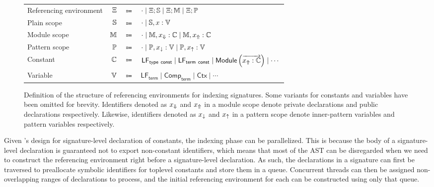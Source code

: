 \begin{figure}[htb]
\centering
\begin{tabular}{lrcl}
Referencing environment & $\Xi$ & $\Coloneqq$ & $\cdot \mid \Xi; \mathbb{S} \mid \Xi; \mathbb{M} \mid \Xi; \mathbb{P}$\\
Plain scope & $\mathbb{S}$ & $\Coloneqq$ & $\cdot \mid \mathbb{S}, x : \mathbb{V}$\\
Module scope & $\mathbb{M}$ & $\Coloneqq$ & $\cdot \mid \mathbb{M}, x_\Downarrow : \mathbb{C} \mid \mathbb{M}, x_\Uparrow : \mathbb{C}$\\
Pattern scope & $\mathbb{P}$ & $\Coloneqq$ & $\cdot \mid \mathbb{P}, x_\downarrow : \mathbb{V} \mid \mathbb{P}, x_\uparrow : \mathbb{V}$\\
Constant & $ \mathbb{C} $ & $ \Coloneqq $ & $\mathsf{LF}_{\mathsf{type\ const}} \mid \mathsf{LF}_{\mathsf{term\ const}} \mid \mathsf{Module}\left(\overrightarrow{x_\Uparrow : \mathbb{C}}\right) \mid \cdots$\\
Variable & $ \mathbb{V} $ & $ \Coloneqq $ & $ \mathsf{LF}_{\mathsf{term}} \mid \mathsf{Comp}_{\mathsf{term}} \mid \mathsf{Ctx} \mid \cdots $
\end{tabular}
\caption[Definition of referencing environments for indexing \Beluga signatures]{%
Definition of the structure of referencing environments for indexing \Beluga signatures.
Some variants for constants and variables have been omitted for brevity.
Identifiers denoted as $x_\Downarrow$ and $x_\Uparrow$ in a module scope denote private declarations and public declarations respectively.
Likewise, identifiers denoted as $x_\downarrow$ and $x_\uparrow$ in a pattern scope denote inner-pattern variables and pattern variables respectively.
}
\label{figure:referencing-environment-definition}
\end{figure}

Given \Beluga's design for signature-level declaration of constants, the indexing phase can be parallelized.
This is because the body of a signature-level declaration is guaranteed not to export non-constant identifiers, which means that most of the \ac{AST} can be disregarded when we need to construct the referencing environment right before a signature-level declaration.
As such, the declarations in a signature can first be traversed to preallocate symbolic identifiers for toplevel constants and store them in a queue.
Concurrent threads can then be assigned non-overlapping ranges of declarations to process, and the initial referencing environment for each can be constructed using only that queue.

